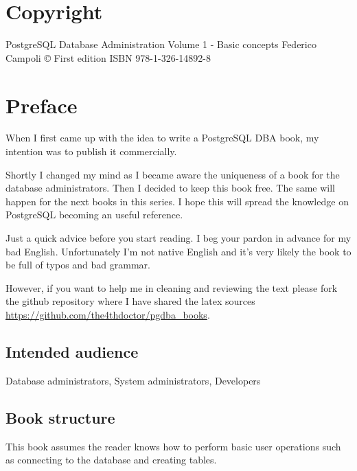 \documentclass[oneside]{book}
\begin{document}
\chapter*{Copyright}
PostgreSQL Database Administration Volume 1 - Basic concepts\newline
Federico Campoli \copyright {} \newline
First edition\newline
ISBN 978-1-326-14892-8\newline %






\chapter*{Preface}
When I first came up with the idea to write a PostgreSQL DBA book, my intention was to
publish it commercially.\newline

Shortly I changed my mind as I became aware the uniqueness of a book for the database
administrators. Then I decided to keep this book free. The same will happen for the
next books in this series. I hope this will spread the knowledge on PostgreSQL becoming an
useful reference.\newline

Just a quick advice before you start reading. I beg your pardon in advance for my
bad English. Unfortunately I'm not native English and it's very likely the book to be full of
typos and bad grammar.\newline

However, if you want to help me in cleaning and reviewing the text please fork
the github repository where I have shared the latex sources
\href{https://github.com/the4thdoctor/pgdba\_books}{
https://github.com/the4thdoctor/pgdba\_books}.\newline


\section*{Intended audience}
Database administrators, System administrators, Developers

\section*{Book structure}
This book assumes the reader knows how to perform basic user operations such as
connecting to the database and creating tables.\newline
\end{document}
